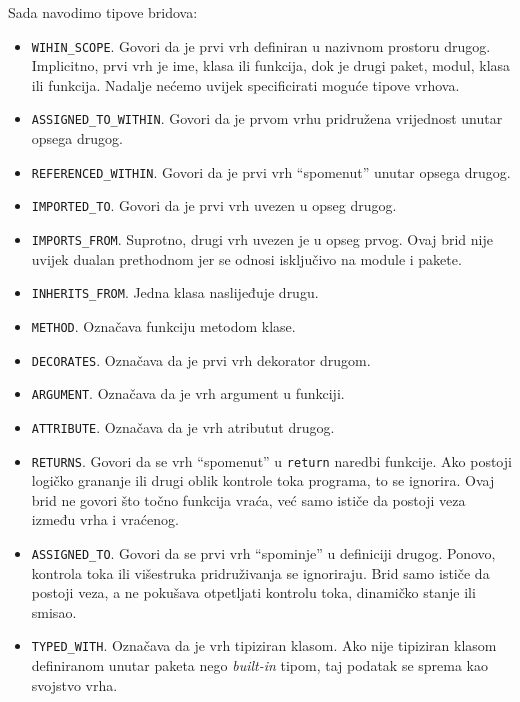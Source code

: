 Sada navodimo tipove bridova:
\begin{itemize}
\item \texttt{WIHIN_SCOPE}. Govori da je prvi vrh definiran u nazivnom prostoru drugog. Implicitno, prvi vrh je ime, klasa ili funkcija,
dok je drugi paket, modul, klasa ili funkcija. Nadalje nećemo uvijek specificirati moguće tipove vrhova.

\item \texttt{ASSIGNED_TO_WITHIN}. Govori da je prvom vrhu pridružena vrijednost unutar opsega drugog.
\item \texttt{REFERENCED_WITHIN}. Govori da je prvi vrh \enquote{spomenut} unutar opsega drugog.

\item \texttt{IMPORTED_TO}. Govori da je prvi vrh uvezen u opseg drugog.
\item \texttt{IMPORTS_FROM}. Suprotno, drugi vrh uvezen je u opseg prvog. Ovaj brid nije uvijek
dualan prethodnom jer se odnosi isključivo na module i pakete.

\item \texttt{INHERITS_FROM}. Jedna klasa naslijeđuje drugu.

\item \texttt{METHOD}. Označava funkciju metodom klase.
\item \texttt{DECORATES}. Označava da je prvi vrh dekorator drugom.
\item \texttt{ARGUMENT}. Označava da je vrh argument u funkciji.

\item \texttt{ATTRIBUTE}. Označava da je vrh atributut drugog.

\item \texttt{RETURNS}. Govori da se vrh \enquote{spomenut} u \texttt{return} naredbi funkcije. Ako postoji
logičko grananje ili drugi oblik kontrole toka programa, to se ignorira. Ovaj brid ne govori
što točno funkcija vraća, već samo ističe da postoji veza između vrha i vraćenog.
\item \texttt{ASSIGNED_TO}. Govori da se prvi vrh \enquote{spominje} u definiciji drugog. Ponovo,
kontrola toka ili višestruka pridruživanja se ignoriraju. Brid samo ističe da postoji veza,
a ne pokušava otpetljati kontrolu toka, dinamičko stanje ili smisao.

\item \texttt{TYPED_WITH}. Označava da je vrh tipiziran klasom. Ako nije tipiziran klasom
definiranom unutar paketa nego \emph{built-in} tipom, taj podatak se sprema kao svojstvo vrha.

\end{itemize}

